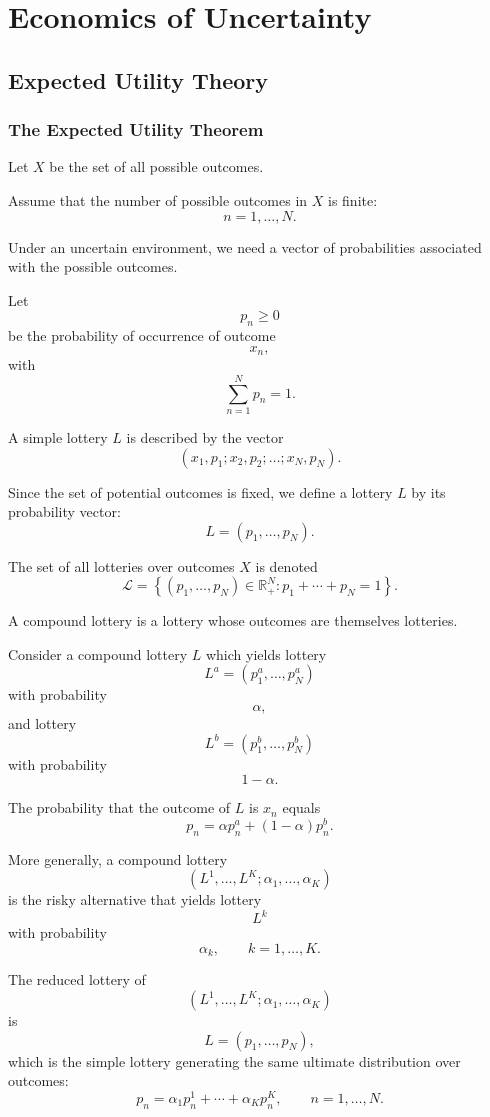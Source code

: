 \chapter{Economics of Uncertainty}

\section{Expected Utility Theory}

\subsection{The Expected Utility Theorem}

Let \(X\) be the set of all possible outcomes.

Assume that the number of possible outcomes in \(X\) is finite:
\[
n=1,\dots,N.
\]

Under an uncertain environment, we need a vector of probabilities associated with the possible outcomes.

Let
\[
p_n\ge 0
\]
be the probability of occurrence of outcome
\[
x_n,
\]
with
\[
\sum_{n=1}^N p_n=1.
\]

A simple lottery \(L\) is described by the vector
\[
(x_1,p_1;x_2,p_2;\dots;x_N,p_N).
\]

Since the set of potential outcomes is fixed, we define a lottery \(L\) by its probability vector:
\[
L=(p_1,\dots,p_N).
\]

The set of all lotteries over outcomes \(X\) is denoted
\[
\mathcal{L}
=
\left\{
(p_1,\dots,p_N)\in\mathbb{R}_+^N
:
p_1+\cdots+p_N=1
\right\}.
\]

A compound lottery is a lottery whose outcomes are themselves lotteries.

Consider a compound lottery \(L\) which yields lottery
\[
L^a=(p_1^a,\dots,p_N^a)
\]
with probability
\[
\alpha,
\]
and lottery
\[
L^b=(p_1^b,\dots,p_N^b)
\]
with probability
\[
1-\alpha.
\]

The probability that the outcome of \(L\) is \(x_n\) equals
\[
p_n
=
\alpha p_n^a
+
(1-\alpha)p_n^b.
\]

More generally, a compound lottery
\[
(L^1,\dots,L^K;\alpha_1,\dots,\alpha_K)
\]
is the risky alternative that yields lottery
\[
L^k
\]
with probability
\[
\alpha_k,
\qquad
k=1,\dots,K.
\]

The reduced lottery of
\[
(L^1,\dots,L^K;\alpha_1,\dots,\alpha_K)
\]
is
\[
L=(p_1,\dots,p_N),
\]
which is the simple lottery generating the same ultimate distribution over outcomes:
\[
p_n
=
\alpha_1 p_n^1
+\cdots+
\alpha_K p_n^K,
\qquad
n=1,\dots,N.
\]

